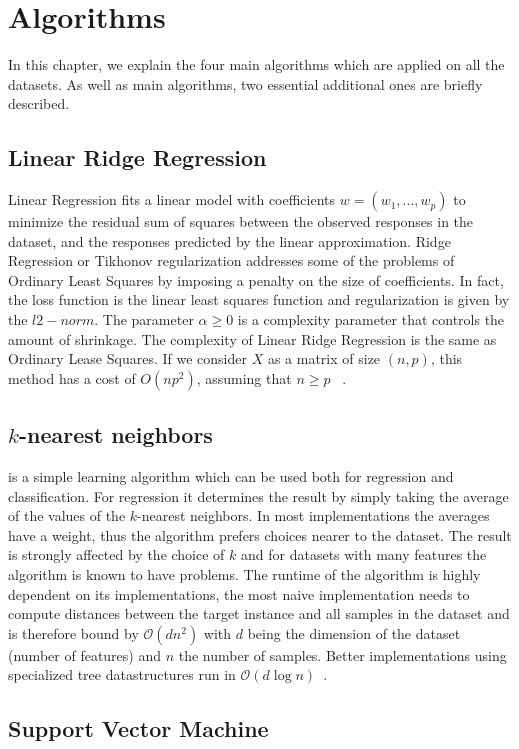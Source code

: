 \section{Algorithms}
In this chapter, we explain the four main algorithms which are applied on all the datasets. As well as main algorithms, two essential additional ones are briefly described.

\subsection{Linear Ridge Regression}
Linear Regression fits a linear model with coefficients $w = (w_1, ..., w_p)$ to minimize the residual sum of squares between the observed responses in the dataset, and the responses predicted by the linear approximation. Ridge Regression or Tikhonov regularization addresses some of the problems of Ordinary Least Squares by imposing a penalty on the size of coefficients. In fact, the loss function is the linear least squares function and regularization is given by the $l2-norm$. The parameter $\alpha \geq 0$ is a complexity parameter that controls the amount of shrinkage. The complexity of Linear Ridge Regression is the same as Ordinary Lease Squares. If we consider $X$ as a matrix of size $(n, p)$, this method has a cost of $O(n p^2)$, assuming that $n \geq p$ ~\cite{alg:lrr}.

\subsection{$k$-nearest neighbors}
is a simple learning algorithm which can be used both for regression and classification. For regression it determines the result by simply taking the average of the values of the $k$-nearest neighbors. In most implementations the averages have a weight, thus the algorithm prefers choices nearer to the dataset. The result is strongly affected by the choice of $k$ and for datasets with many features the algorithm is known to have problems. The runtime of the algorithm is highly dependent on its implementations, the most naive implementation needs to compute distances between the target instance and all samples in the dataset and is therefore bound by $\mathcal{O}(dn^2)$ with $d$ being the dimension of the dataset (number of features) and $n$ the number of samples. Better implementations using specialized tree datastructures run in $\mathcal{O}(d\log n)$~\cite{alg:knn}.
\subsection{Support Vector Machine}
